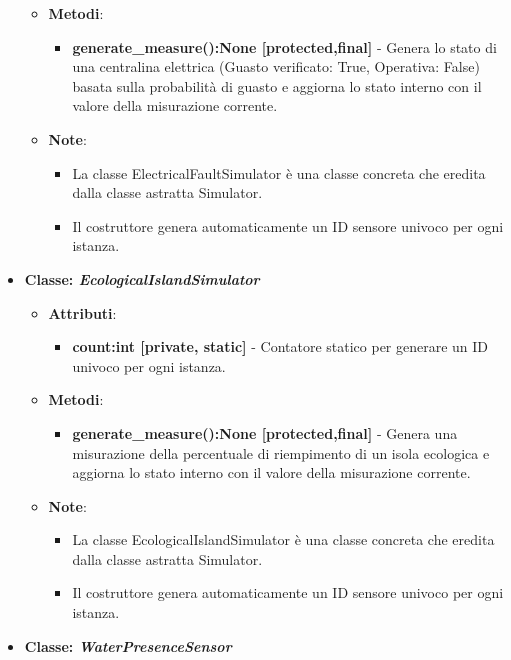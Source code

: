 \begin{itemize}
\begin{itemize}
\begin{itemize}
    \end{itemize}
    \item   \textbf{Metodi}: 
    \begin{itemize}
        \item \textbf{generate\_measure():None [protected,final]} - Genera lo stato di una centralina elettrica (Guasto verificato: True, Operativa: False) basata sulla probabilità di guasto e aggiorna lo stato interno con il valore della misurazione corrente.
    \end{itemize}
    \item   \textbf{Note}:
    \begin{itemize}
        \item La classe ElectricalFaultSimulator è una classe concreta che eredita dalla classe astratta Simulator.
        \item Il costruttore genera automaticamente un ID sensore univoco per ogni istanza.
    \end{itemize}
\end{itemize}
    \item{\textbf{Classe: \textit{EcologicalIslandSimulator}}}
    \begin{itemize}
        \item    \textbf{Attributi}: 
    \begin{itemize}
        \item \textbf{count:int [private, static]} - Contatore statico per generare un ID univoco per ogni istanza.
    \end{itemize}
    \item    \textbf{Metodi}: 
    \begin{itemize}
        \item \textbf{generate\_measure():None [protected,final]} - Genera una misurazione della percentuale di riempimento di un isola ecologica e aggiorna lo stato interno con il valore della misurazione corrente.
    \end{itemize}
    \item    \textbf{Note}:
    \begin{itemize}
        \item La classe EcologicalIslandSimulator è una classe concreta che eredita dalla classe astratta Simulator.
        \item Il costruttore genera automaticamente un ID sensore univoco per ogni istanza.
    \end{itemize}
\end{itemize}
    \item{\textbf{Classe: \textit{WaterPresenceSensor}}}

\end{itemize}
